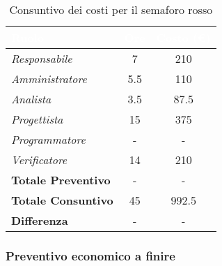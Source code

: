 \begin{table}[H]
    \renewcommand\arraystretch{1.5}
    \centering
    \begin{tabular}{|l|c|c|}
    \hline
    \rowcolor[HTML]{036400}
    \textcolor{white}{\textbf{Ruolo}} & \multicolumn{1}{l|}{\textcolor{white}{\textbf{Ore}}} & \multicolumn{1}{l|}{\textcolor{white}{\textbf{Costo (€)}}} \\ \hline
    \rowcolor[HTML]{EFEFEF}\textit{Responsabile}      & 7            & 210                 \\ \hline
    \rowcolor[HTML]{C0C0C0}\textit{Amministratore}    & 5.5          & 110                 \\ \hline
    \rowcolor[HTML]{EFEFEF}\textit{Analista}          & 3.5          & 87.5                 \\ \hline
    \rowcolor[HTML]{C0C0C0}\textit{Progettista}       & 15           & 375                 \\ \hline
    \rowcolor[HTML]{EFEFEF}\textit{Programmatore}     & -            & -                 \\ \hline
    \rowcolor[HTML]{C0C0C0}\textit{Verificatore}      & 14           & 210                 \\ \hline
    \rowcolor[HTML]{EFEFEF}\textbf{Totale Preventivo} & -            & -                \\ \hline
    \rowcolor[HTML]{C0C0C0}\textbf{Totale Consuntivo} & 45           & 992.5            \\ \hline
    \rowcolor[HTML]{EFEFEF}\textbf{Differenza}        & -            & -                \\ \hline
    \end{tabular}
    \caption{Consuntivo dei costi per il semaforo rosso}
\end{table}

\subsubsection{Preventivo economico a finire}

